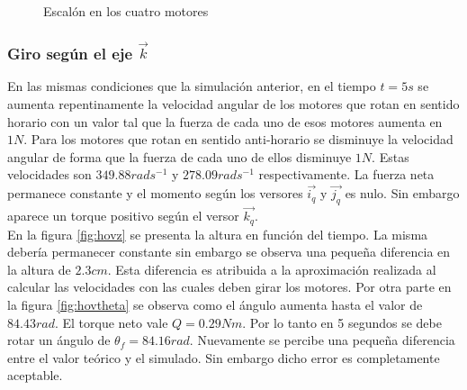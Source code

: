 \documentclass[main]{subfiles}
\begin{document}
\begin{figure} [h!]
  \centering
  \caption{Escal\'on en los cuatro motores}
  \label{fig:escalon}
\end{figure}

\subsubsection{Giro seg\'un el eje $\vec{k}$}

En las mismas condiciones que la simulaci\'on anterior, en el tiempo $t=5s$ se aumenta repentinamente la velocidad angular de los motores que rotan en sentido horario con un valor tal que la fuerza de cada uno de esos motores aumenta en $1N$. Para los motores que rotan en sentido anti-horario se disminuye la velocidad angular de forma que la fuerza de cada uno de ellos disminuye $1N$. Estas velocidades son $349.88rads^{-1}$ y $278.09rads^{-1}$ respectivamente. La fuerza neta permanece constante y el momento seg\'un los versores $\vec{i_q}$ y $\vec{j_q} $ es nulo. Sin embargo aparece un torque positivo seg\'un el versor $\vec{k_q}$.\\

En la figura \ref{fig:hovz} se presenta la altura en funci\'on del tiempo. La misma deber\'ia permanecer constante sin embargo se observa una peque\~na diferencia en la altura de $2.3cm$. Esta diferencia es atribuida a la aproximaci\'on realizada al calcular las velocidades con las cuales deben girar los motores. Por otra parte en la figura \ref{fig:hovtheta} se observa como el \'angulo aumenta hasta el valor de $84.43 rad$. El torque neto vale $Q = 0.29Nm $. Por lo tanto en 5 segundos se debe rotar un \'angulo de $\theta_f=84.16rad$. Nuevamente se percibe una peque\~na diferencia entre el valor te\'orico y el simulado. Sin embargo dicho error es completamente aceptable. 
\end{document}
